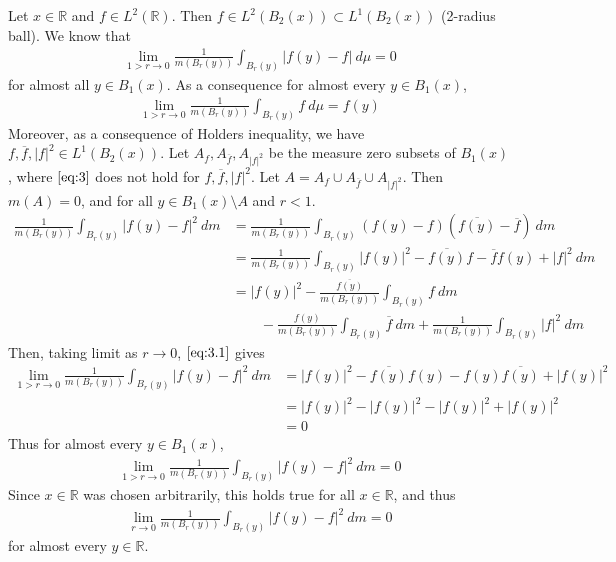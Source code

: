 \documentclass[12pt]{exam}
\theoremstyle{plain} %
\theoremstyle{definition} %
\theoremstyle{remark} %
\begin{document}
\begin{questions}
  \question
  \begin{solution}
    Let $x \in \mathbb{R}$ and $f \in L^{2}(\mathbb{R})$. Then $f \in
    L^2(B_2(x)) \subset L^{1}(B_2(x))$ (2-radius ball). We know that
    \begin{align}
      \label{eq:3}
      \lim_{1 > r \to 0} \frac{1}{m(B_r(y))} \int_{B_r(y)} |f(y) - f|
      \ d \mu = 0
    \end{align}
    for almost all $y \in B_1(x)$. As a consequence for almost every
    $y \in B_1(x)$,
    \begin{align}
      \label{eq:3.1}
      \lim_{1> r \to 0} \frac{1}{m(B_r(y))} \int_{B_r(y)}  f \ d \mu = f(y)
    \end{align}
    Moreover,  as a consequence of Holders
    inequality, we have $f, \overline{f}, |f|^2 \in  L^{1}(B_2(x))$.
    Let $A_f, A_{\overline{ f}}, A_{|f|^2}$ be the measure zero subsets
    of $B_1(x)$, where $\autoref{eq:3}$ does not hold for $f,
    \overline{f}, |f|^2$. Let $A = A_f \cup A_{\overline{ f}} \cup
    A_{|f|^2}$. Then $m(A) = 0$, and for all $y \in B_1(x) \setminus A$
    and $r< 1$.
    \begin{align*}
      \frac{1}{m(B_r(y))} \int_{B_r(y)} |f(y) - f|^2 \ d m &=
      \frac{1}{m(B_r(y))} \int_{B_r(y)} (f(y) - f)(\overline{f(y)} -
      \overline{f}) \ d m \\
      &= \frac{1}{m(B_r(y))} \int_{B_r(y)}  |f(y)|^2 -
      \overline{f(y)} f - \overline{f}f(y) + |f|^2 \ d m \\
      &= |f(y)|^2 - \frac{\overline{f(y)}}{m(B_r(y))} \int_{B_r(y)}
      f \ d m  \\
      & \quad \quad - \frac{f(y)}{m(B_r(y))} \int_{B_r(y)}  \overline{f}
      \ d m + \frac{1}{m(B_r(y))} \int_{B_r(y)}  |f|^2 \ d m
    \end{align*}
    Then, taking limit as $r \to 0$, $\autoref{eq:3.1}$ gives
    \begin{align*}
      \lim_{1 > r \to 0} \frac{1}{m(B_r(y))} \int_{B_r(y)} |f(y) -
      f|^2 \ d m &= |f(y)|^2 - \overline{f(y)}f(y) - f(y)
      \overline{f(y)} + |f(y)|^2 \\
      &= |f(y)|^2 - |f(y)|^2 - |f(y)|^2 + |f(y)|^2 \\
      &= 0
    \end{align*}
    Thus for almost every $y \in B_1(x)$,
    \begin{align*}
      \lim_{1 > r \to 0} \frac{1}{m(B_r(y))} \int_{B_r(y)} |f(y) -
      f|^2 \ d m =0
    \end{align*}
    Since $x \in \mathbb{R}$ was chosen arbitrarily, this holds true
    for all $x \in \mathbb{R}$, and thus
    \begin{align*}
      \lim_{r \to 0} \frac{1}{m(B_r(y))} \int_{B_r(y)} |f(y) -
      f|^2 \ d m =0
    \end{align*}
    for almost every $y \in \mathbb{R}$.
  \end{solution}


\end{questions}
\end{document}
